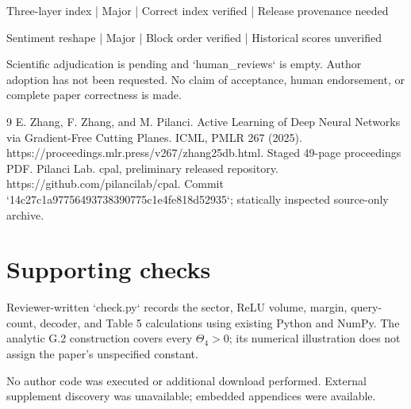 \documentclass[10pt]{article}
\begin{document}
Three-layer index | Major | Correct index verified | Release provenance needed\par
Sentiment reshape | Major | Block order verified | Historical scores unverified\par
Scientific adjudication is pending and `human\_reviews` is empty. Author adoption has not been requested. No claim of acceptance, human endorsement, or complete paper correctness is made.\par
9 E. Zhang, F. Zhang, and M. Pilanci. Active Learning of Deep Neural Networks via Gradient-Free Cutting Planes. ICML, PMLR 267 (2025). https://proceedings.mlr.press/v267/zhang25db.html. Staged 49-page proceedings PDF. Pilanci Lab. cpal, preliminary released repository. https://github.com/pilancilab/cpal. Commit `14c27c1a97756493738390775c1e4fe818d52935`; statically inspected source-only archive.\par
\section*{Supporting checks}
Reviewer-written `check.py` records the sector, ReLU volume, margin, query-count, decoder, and Table 5 calculations using existing Python and NumPy. The analytic G.2 construction covers every \(\Theta_4>0\); its numerical illustration does not assign the paper’s unspecified constant.\par
No author code was executed or additional download performed. External supplement discovery was unavailable; embedded appendices were available.\par
\end{document}
